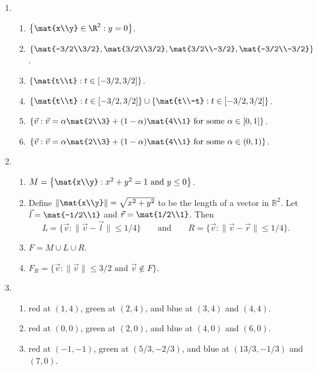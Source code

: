 		\begin{enumerate}
			\item \begin{enumerate}
					\item $\left\{\mat{x\\y}\in\R^2:y=0\right\}$.
					\item $\left\{\mat{-3/2\\3/2},\mat{3/2\\3/2},\mat{3/2\\-3/2},\mat{-3/2\\-3/2}
							\right\}$.
					\item $\left\{\mat{t\\t}:t\in[-3/2,3/2]\right\}$.
					\item $\left\{\mat{t\\t}:t\in[-3/2,3/2]\right\}\cup \left\{\mat{t\\-t}:t\in[-3/2,3/2]\right\}$.
					\item $\left\{\vec v: \vec v=\alpha \mat{2\\3}+(1-\alpha)\mat{4\\1}\text{ for some }\alpha\in[0,1]\right\}$.
					\item $\left\{\vec v: \vec v=\alpha \mat{2\\3}+(1-\alpha)\mat{4\\1}\text{ for some }\alpha\in(0,1)\right\}$.
			\end{enumerate}
			\item \begin{enumerate}
					\item $M=
						\left\{\mat{x\\y}: x^2+y^2 = 1\text{ and }y\leq 0\right\}$.
					\item Define $\left\|\mat{x\\y}\right\|=\sqrt{x^2+y^2}$ to
						be the length of a vector in $\mathbb R^2$.
						Let $\vec l=\mat{-1/2\\1}$ and $\vec r=\mat{1/2\\1}$. Then \[L=\{\vec v:\|\vec v-\vec l\|\leq 1/4\}
						\qquad\text{and}\qquad R=\{\vec v:\|\vec v-\vec r\|\leq 1/4\}.\]
					\item $F=M\cup L\cup R$.
					\item $F_R=\{\vec v:\|\vec v\| \leq 3/2\text{ and }\vec v\notin F\}$.
			\end{enumerate}
			\item \begin{enumerate}
				\item red at $(1,4)$, green at $(2,4)$, and blue at $(3,4)$ and $(4,4)$.
				\item red at $(0,0)$, green at $(2,0)$, and blue at $(4,0)$ and $(6,0)$.
				\item red at $(-1,-1)$, green at $(5/3,-2/3)$, and blue at $(13/3,-1/3)$ and $(7,0)$.
			\end{enumerate}
		\end{enumerate}